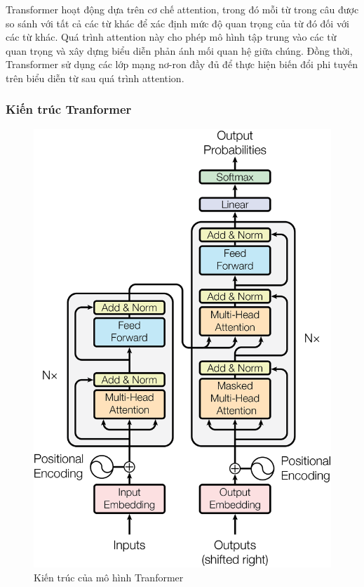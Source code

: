Transformer hoạt động dựa trên cơ chế attention, trong đó mỗi từ trong câu được so sánh với tất cả các từ khác để xác định mức độ quan trọng của từ đó đối với các từ khác. Quá trình attention này cho phép mô hình tập trung vào các từ quan trọng và xây dựng biểu diễn phản ánh mối quan hệ giữa chúng. Đồng thời, Transformer sử dụng các lớp mạng nơ-ron đầy đủ để thực hiện biến đổi phi tuyến trên biểu diễn từ sau quá trình attention.

\subsubsection{Kiến trúc Tranformer}
\begin{figure}[htb]
    \centering
    \includegraphics[width=\textwidth]{image/tranformer-architecture.png}
    \caption{Kiến trúc của mô hình Tranformer}
    \label{figure:tranformer-architecture}
\end{figure}



